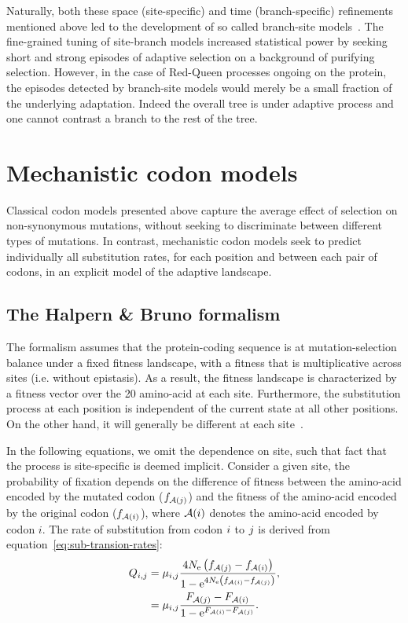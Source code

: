 Naturally, both these space (site-specific) and time (branch-specific) refinements mentioned above led to the development of so called branch-site models~\citep{Yang2002a, Zhang2004, Pond2011, Murrell2012, Murrell2013}.
The fine-grained tuning of site-branch models increased statistical power by seeking short and strong episodes of adaptive selection on a background of purifying selection.
However, in the case of Red-Queen processes ongoing on the protein, the episodes detected by branch-site models would merely be a small fraction of the underlying adaptation.
Indeed the overall tree is under adaptive process and one cannot contrast a branch to the rest of the tree.


\section{Mechanistic {codon} models}
\label{sec:intro-mechanistic-codon-models}

Classical codon models presented above capture the average effect of selection on non-synonymous mutations, without seeking to discriminate between different types of mutations.
In contrast, mechanistic codon models seek to predict individually all substitution rates, for each position and between each pair of codons, in an explicit model of the adaptive landscape.

\subsection{The Halpern \& Bruno formalism}
\label{subsec:HB-formalism}

The \citet{Halpern1998} formalism assumes that the protein-coding sequence is at mutation-selection balance under a fixed fitness landscape, with a fitness that is multiplicative across sites (i.e. without epistasis).
As a result, the fitness landscape is characterized by a fitness vector over the 20 amino-acid at each site.
Furthermore, the substitution process at each position is independent of the current state at all other positions.
On the other hand, it will generally be different at each site~\citep{Rodrigue2010, Tamuri2012}.

In the following equations, we omit the dependence on site, such that fact that the process is site-specific is deemed implicit.
Consider a given site, the probability of fixation depends on the difference of fitness between the amino-acid encoded by the mutated \gls{codon} ($f_{\mathcal{A}({j})}$) and the fitness of the amino-acid encoded by the original \gls{codon} ($f_{\mathcal{A}({i})}$), where $\mathcal{A}({i})$ denotes the amino-acid encoded by \gls{codon} $i$.
The rate of \gls{substitution} from \gls{codon} ${i}$ to ${j}$ is derived from equation~\ref{eq:sub-transion-rates}:
\begin{align}
    Q_{{i}, {j}} & = \mu_{{i}, {j}} \dfrac{4 N_{\textrm{e}} \left({f_{\mathcal{A}({j})} - f_{\mathcal{A}({i})}}\right)}{{1 - \mathrm{e}^{4 N_{\textrm{e}} \left({f_{\mathcal{A}({i})} - f_{\mathcal{A}({j})}}\right)} }}, \\
    & = \mu_{{i}, {j}} \dfrac{F_{\mathcal{A}({j})} - F_{\mathcal{A}({i})}}{1 - \mathrm{e}^{F_{\mathcal{A}({i})} - F_{\mathcal{A}({j})}} }.
\end{align}


